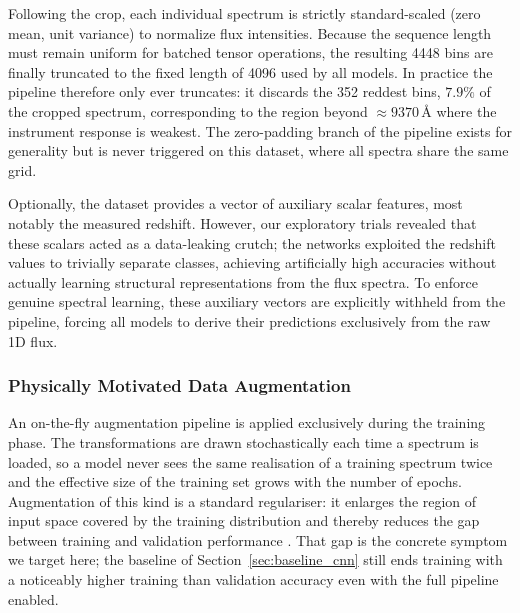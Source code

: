 Following the crop, each individual spectrum is strictly standard-scaled (zero mean, unit
variance) to normalize flux intensities. Because the sequence length must remain uniform
for batched tensor operations, the resulting 4448 bins are finally truncated to the fixed
length of 4096 used by all models. In practice the pipeline therefore only ever truncates:
it discards the 352 reddest bins, $7.9\%$ of the cropped spectrum, corresponding to the
region beyond $\approx 9370$\,\AA{} where the instrument response is weakest. The
zero-padding branch of the pipeline exists for generality but is never triggered on this
dataset, where all spectra share the same grid.

Optionally, the dataset provides a vector of auxiliary scalar features, most notably the measured redshift. However, our exploratory trials revealed that these scalars acted as a data-leaking crutch; the networks exploited the redshift values to trivially separate classes, achieving artificially high accuracies without actually learning structural representations from the flux spectra. To enforce genuine spectral learning, these auxiliary vectors are explicitly withheld from the pipeline, forcing all models to derive their predictions exclusively from the raw 1D flux.

\subsubsection{Physically Motivated Data Augmentation}
\label{sec:augmentation}
An on-the-fly augmentation pipeline is applied exclusively during the training phase. The
transformations are drawn stochastically each time a spectrum is loaded, so a model never
sees the same realisation of a training spectrum twice and the effective size of the
training set grows with the number of epochs. Augmentation of this kind is a standard
regulariser: it enlarges the region of input space covered by the training distribution
and thereby reduces the gap between training and validation performance
\cite{shorten2019augmentation}. That gap is the concrete symptom we target here; the
baseline of Section~\ref{sec:baseline_cnn} still ends training with a noticeably higher
training than validation accuracy even with the full pipeline enabled.

